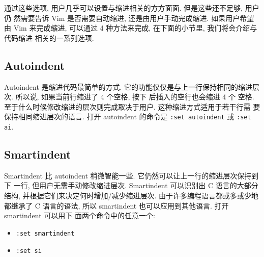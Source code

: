 通过这些选项, 用户几乎可以设置与缩进相关的方方面面. 但是这些还不足够, 用户仍
然需要告诉 Vim 是否需要自动缩进, 还是由用户手动完成缩进. 如果用户希望由 Vim
来完成缩进, 可以通过 4 种方法来完成, 在下面的小节里, 我们将会介绍与代码缩进
相关的一系列选项.

\subsection{Autoindent}
\label{subsec:autoindent}

Autoindent 是缩进代码最简单的方式. 它的功能仅仅是与上一行保持相同的缩进层次.
所以说, 如果当前行缩进了 4 个空格, 按下  后插入的空行也会缩进 4 个
空格. 至于什么时候修改缩进的层次则完成取决于用户. 这种缩进方式适用于若干行需
要保持相同缩进层次的语言. 打开 autoindent 的命令是 \texttt{:set autoindent}
或 \texttt{:set ai}.

\subsection{Smartindent}
\label{subsec:smartindent}

Smartindent 比 autoindent 稍微智能一些. 它仍然可以让上一行的缩进层次保持到下
一行, 但用户无需手动修改缩进层次. Smartindent 可以识别出 C 语言的大部分结构,
并根据它们来决定何时增加/减少缩进层次. 由于许多编程语言都或多或少地都继承了 C
语言的语法, 所以 smartindent 也可以应用到其他语言. 打开 smartindent 可以用下
面两个命令中的任意一个:
\begin{itemize}
    \item \texttt{:set smartindent}
    \item \texttt{:set si}
\end{itemize}
